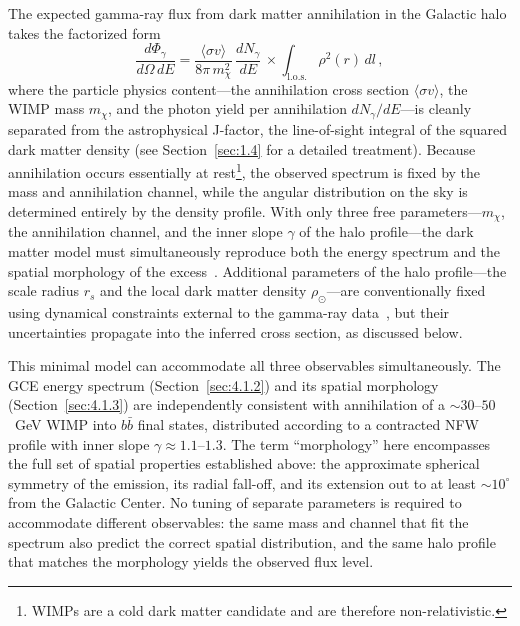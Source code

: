 The expected gamma-ray flux from dark matter annihilation in the Galactic halo takes the factorized form
\begin{equation}
	\frac{d\Phi_\gamma}{d\Omega\, dE} = \frac{\langle \sigma v \rangle}{8\pi\, m_\chi^2}\, \frac{dN_\gamma}{dE}\, \times \int_{\mathrm{l.o.s.}} \rho^2(r)\, dl\,,
	\label{eq:dm_flux_gce}
\end{equation}
where the particle physics content---the annihilation cross section $\langle \sigma v \rangle$, the WIMP mass $m_\chi$, and the photon yield per annihilation $dN_\gamma/dE$---is cleanly separated from the astrophysical J-factor, the line-of-sight integral of the squared dark matter density (see Section~\ref{sec:1.4} for a detailed treatment).
Because annihilation occurs essentially at rest\footnote{WIMPs are a cold dark matter candidate and are therefore non-relativistic.}, the observed spectrum is fixed by the mass and annihilation channel, while the angular distribution on the sky is determined entirely by the density profile.
With only three free parameters---$m_\chi$, the annihilation channel, and the inner slope $\gamma$ of the halo profile---the dark matter model must simultaneously reproduce both the energy spectrum and the spatial morphology of the excess~\cite{Daylan:2014rsa}.
Additional parameters of the halo profile---the scale radius $r_s$ and the local dark matter density $\rho_\odot$---are conventionally fixed using dynamical constraints external to the gamma-ray data~\cite{Abazajian:2014fta,Daylan:2014rsa}, but their uncertainties propagate into the inferred cross section, as discussed below.

This minimal model can accommodate all three observables simultaneously.
The GCE energy spectrum (Section~\ref{sec:4.1.2}) and its spatial morphology (Section~\ref{sec:4.1.3}) are independently consistent with annihilation of a $\sim 30$--$50$~GeV WIMP into $b\bar{b}$ final states, distributed according to a contracted NFW profile with inner slope $\gamma \approx 1.1$--$1.3$.
The term ``morphology'' here encompasses the full set of spatial properties established above: the approximate spherical symmetry of the emission, its radial fall-off, and its extension out to at least $\sim 10^\circ$ from the Galactic Center.
No tuning of separate parameters is required to accommodate different observables: the same mass and channel that fit the spectrum also predict the correct spatial distribution, and the same halo profile that matches the morphology yields the observed flux level.

